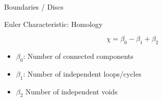 \documentclass{beamer}
\begin{document}
\begin{frame}{Boundaries / Discs}



\end{frame}


\begin{frame}{Euler Characteristic: Homology}

\[ \chi = \beta_0 - \beta_1 + \beta_2 \]

\begin{itemize}[label=$\blacktriangleright$]

\item $\beta_0$: Number of connected components

\item $\beta_1$: Number of independent loops/cycles

\item $\beta_2$ Number of independent voids

\end{itemize}

\end{frame}
\end{document}
